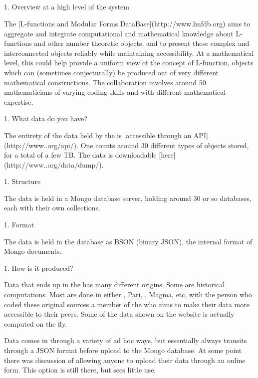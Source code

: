 \subsection{\GAP}

\subsection{\LMFDB}

1. Overview at a high level of the \LMFDB system

 The [L-functions and Modular Forms DataBase](http://www.lmfdb.org) aims to aggregate and integrate computational and mathematical knowledge about L-functions and other number theoretic objects, and to present these complex and interconnected objects reliably while maintaining accessibility. At a mathematical level, this could help provide a uniform view of the concept of L-function, objects which can (sometimes conjecturally) be produced out of very different mathematical constructions. The collaboration involves around 50 mathematicians of varying coding skills and with different mathematical expertise.

1. What data do you have?

 The entirety of the data held by the \LMFDB is [accessible through an API](http://www.\LMFDB.org/api/). One counts around 30 different types of objects stored, for a total of a few TB. The data is downloadable  [here](http://www.\LMFDB.org/data/dump/).

 1. Structure

   The data is held in a Mongo database server, holding around 30 or so databases, each with their own collections.

 1. Format

   The data is held in the database as BSON (binary JSON), the internal format of Mongo documents.

 1. How is it produced?

   Data that ends up in the \LMFDB has many different origins. Some are historical computations. Most are done in either \GAP, Pari, \SageMath, Magma, etc, with the person who coded these original sources a member of the \LMFDB who aims to make their data more accessible to their peers. Some of the data shown on the website is actually computed on the fly.

    Data comes in through a variety of ad hoc ways, but essentially always transits through a JSON format before upload to the Mongo database. At some point there was discussion of allowing anyone to upload their data through an online form. This option is still there, but sees little use.

